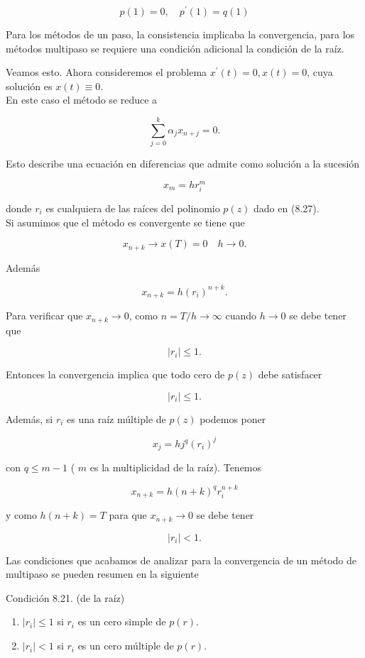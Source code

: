 \documentclass[10pt]{book}
\begin{document}
$$
p(1)=0, \quad p^{\prime}(1)=q(1)
$$

Para los métodos de un paso, la consistencia implicaba la convergencia, para los métodos multipaso se requiere una condición adicional la condición de la raíz.

Veamos esto. Ahora consideremos el problema $x^{\prime}(t)=0, x(t)=0$, cuya solución es $x(t) \equiv 0$.\\
En este caso el método se reduce a

$$
\sum_{j=0}^{k} \alpha_{j} x_{n+j}=0 .
$$

Esto describe una ecuación en diferencias que admite como solución a la sucesión

$$
x_{m}=h r_{i}^{m}
$$

donde $r_{i}$ es cualquiera de las raíces del polinomio $p(z)$ dado en (8.27).\\
Si asumimos que el método es convergente se tiene que

$$
x_{n+k} \rightarrow x(T)=0 \quad h \rightarrow 0 .
$$

Además

$$
x_{n+k}=h\left(r_{i}\right)^{n+k} .
$$

Para verificar que $x_{n+k} \rightarrow 0$, como $n=T / h \rightarrow \infty$ cuando $h \rightarrow 0$ se debe tener que

$$
\left|r_{i}\right| \leq 1 .
$$

Entonces la convergencia implica que todo cero de $p(z)$ debe satisfacer

$$
\left|r_{i}\right| \leq 1 .
$$

Además, si $r_{i}$ es una raíz múltiple de $p(z)$ podemos poner

$$
x_{j}=h j^{q}\left(r_{i}\right)^{j}
$$

con $q \leq m-1$ ( $m$ es la multiplicidad de la raíz). Tenemos

$$
x_{n+k}=h(n+k)^{q} r_{i}^{n+k}
$$

y como $h(n+k)=T$ para que $x_{n+k} \rightarrow 0$ se debe tener

$$
\left|r_{i}\right|<1 .
$$

Las condiciones que acabamos de analizar para la convergencia de un método de multipaso se pueden resumen en la siguiente

Condición 8.21. (de la raíz)

\begin{enumerate}
  \item $\left|r_{i}\right| \leq 1$ si $r_{i}$ es un cero simple de $p(r)$.
  \item $\left|r_{i}\right|<1$ si $r_{i}$ es un cero múltiple de $p(r)$.
\end{enumerate}
\end{document}
